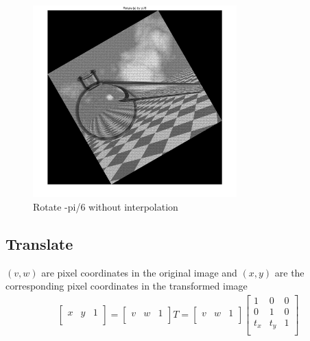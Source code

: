 \documentclass[11pt,oneside]{book}
\begin{document}
\begin{figure}[!htb]
   \centering  
   \includegraphics[width=0.7\textwidth]{images/6/rotate_pi_.jpg}
   \caption{Rotate -pi/6 without interpolation}
\end{figure}
\newpage

\subsection{Translate}
$(v, w)$ are pixel coordinates in the original image and $(x, y)$ are the corresponding pixel coordinates in the transformed image
\begin{align}
\left[               
  \begin{array}{ccc}  
    x & y & 1\\ 
  \end{array}
\right] 
=
\left[               
  \begin{array}{ccc}  
    v & w & 1\\ 
  \end{array}
\right]
T
=
\left[               
  \begin{array}{ccc}  
    v & w & 1\\ 
  \end{array}
\right]
\left[               
  \begin{array}{ccc}  
    1 & 0 & 0\\
    0 & 1 & 0\\
    t_x & t_y & 1\\ 
  \end{array}
\right]
\end{align}
\end{document}
